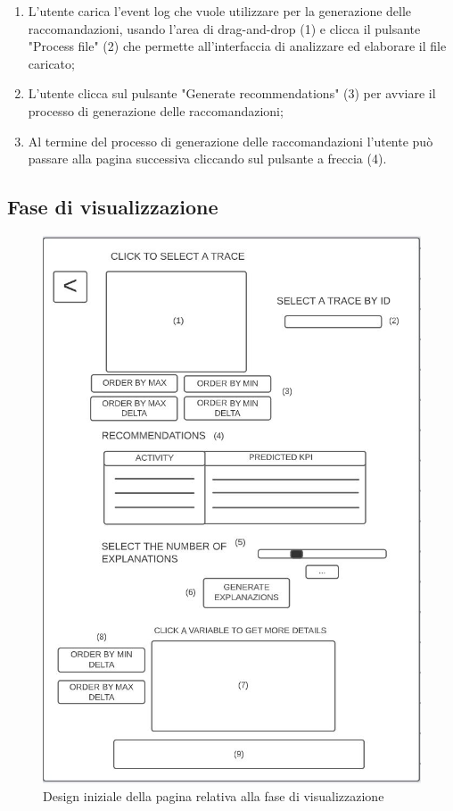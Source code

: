 \begin{enumerate}

\item L'utente carica l'event log che vuole utilizzare per la generazione delle raccomandazioni, usando l'area di \gls{drag-and-drop} (1) e clicca il pulsante "Process file" (2) che permette all'interfaccia di analizzare ed elaborare il file caricato;

\item L'utente clicca sul pulsante "Generate recommendations" (3) per avviare il processo di generazione delle raccomandazioni;

\item Al termine del processo di generazione delle raccomandazioni l'utente può passare alla pagina successiva cliccando sul pulsante a freccia (4).

\end{enumerate}


\subsection{Fase di visualizzazione}

\begin{figure}[!h] 
    \centering 
    \includegraphics[width=0.7\columnwidth]{immagini/mockup-explain.jpg} 
    \caption{Design iniziale della pagina relativa alla fase di visualizzazione}
    \label{fig:mockup-explain}
\end{figure}

